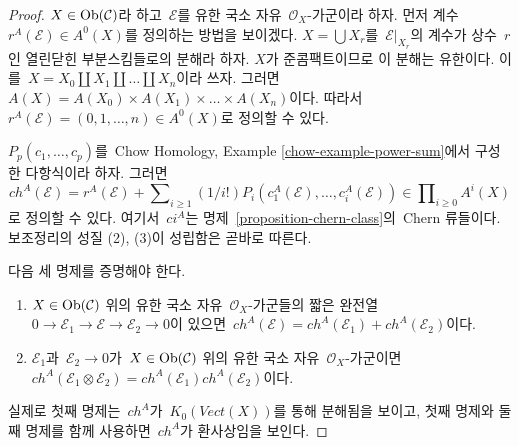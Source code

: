 \begin{proof}
$X \in \mathop{\mathrm{Ob}}\nolimits(\mathcal{C})$라 하고\  $\mathcal{E}$를 유한 국소 자유\ 
$\mathcal{O}_X$-가군이라 하자. 먼저 계수\ 
$r^A(\mathcal{E}) \in A^0(X)$를 정의하는 방법을 보이겠다.
$X = \bigcup X_r$를\  $\mathcal{E}|_{X_r}$의 계수가 상수\  $r$인
열린닫힌 부분스킴들로의 분해라 하자. $X$가 준콤팩트이므로 이 분해는
유한이다. 이를\  $X = X_0 \amalg X_1 \amalg \ldots \amalg X_n$이라
쓰자. 그러면\  $A(X) = A(X_0) \times A(X_1) \times \ldots \times A(X_n)$이다.
따라서\  $r^A(\mathcal{E}) = (0, 1, \ldots, n) \in A^0(X)$로 정의할
수 있다.

\medskip\noindent
$P_p(c_1, \ldots, c_p)$를\  Chow Homology, Example
\ref{chow-example-power-sum}에서 구성한 다항식이라 하자. 그러면
$$
ch^A(\mathcal{E}) = r^A(\mathcal{E}) +
\sum\nolimits_{i \geq 1} (1/i!)
P_i(c^A_1(\mathcal{E}), \ldots, c^A_i(\mathcal{E}))
\in \prod\nolimits_{i \geq 0} A^i(X)
$$
로 정의할 수 있다. 여기서\  $ci^A$는 명제\ 
\ref{proposition-chern-class}의\  Chern 류들이다. 보조정리의 성질
(2), (3)이 성립함은 곧바로 따른다.

\medskip\noindent
다음 세 명제를 증명해야 한다.
\begin{enumerate}
\item $X \in \mathop{\mathrm{Ob}}\nolimits(\mathcal{C})$ 위의 유한 국소 자유\ 
$\mathcal{O}_X$-가군들의 짧은 완전열\ 
$0 \to \mathcal{E}_1 \to \mathcal{E} \to \mathcal{E}_2 \to 0$이
있으면\ 
$ch^A(\mathcal{E}) = ch^A(\mathcal{E}_1) + ch^A(\mathcal{E}_2)$이다.
\item $\mathcal{E}_1$과\  $\mathcal{E}_2 \to 0$가\ 
$X \in \mathop{\mathrm{Ob}}\nolimits(\mathcal{C})$ 위의 유한 국소 자유\ 
$\mathcal{O}_X$-가군이면\ 
$ch^A(\mathcal{E}_1 \otimes \mathcal{E}_2) =
ch^A(\mathcal{E}_1) ch^A(\mathcal{E}_2)$이다.
\end{enumerate}
실제로 첫째 명제는\  $ch^A$가\  $K_0(\textit{Vect}(X))$를 통해
분해됨을 보이고, 첫째 명제와 둘째 명제를 함께 사용하면\  $ch^A$가
환사상임을 보인다.


\end{proof}
